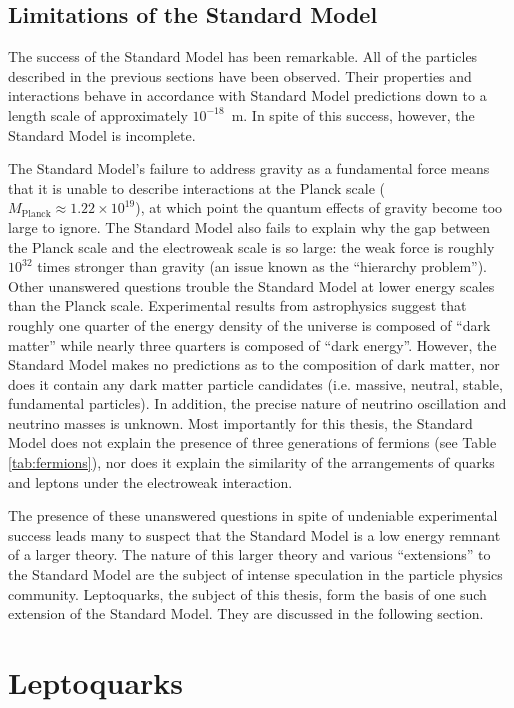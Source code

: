 \subsection{Limitations of the Standard Model}

The success of the Standard Model has been remarkable.
All of the particles described in the previous sections have been 
observed.  Their properties and interactions behave in accordance 
with Standard Model predictions down to a length scale of 
approximately $10^{-18}$~m.  In spite of this success, however, the 
Standard Model is incomplete.  

The Standard Model's failure to address gravity as a fundamental
force means that it is unable to describe interactions at the Planck 
scale ($M_{\text{Planck}} \approx 1.22 \times 10^{19}$), at which
point the quantum effects of gravity become too large to ignore.
The Standard Model also fails to explain why the gap between the Planck
scale and the electroweak scale is so large: the weak force is roughly 
$10^{32}$ times stronger than gravity
(an issue known as the ``hierarchy problem'').
Other unanswered questions trouble the Standard Model at lower energy
scales than the Planck scale.  Experimental results from
astrophysics suggest that roughly one quarter of the energy density of the
universe is composed of ``dark matter'' while nearly three quarters 
is composed of ``dark energy''.  However, the Standard Model makes no predictions
as to the composition of dark matter, nor does it contain any dark
matter particle candidates (i.e. massive, neutral, stable, fundamental particles).
In addition, the precise nature of neutrino oscillation and neutrino masses
is unknown.  Most importantly for this thesis, the Standard Model does not 
explain the presence of three generations of fermions (see Table \ref{tab:fermions}), nor
does it explain the similarity of the arrangements of quarks and leptons under the electroweak interaction.

The presence of these unanswered questions in spite of undeniable 
experimental success leads many to suspect that the Standard Model
is a low energy remnant of a larger theory.  The nature of this larger
theory and various ``extensions'' to the Standard Model are the subject
of intense speculation in the particle physics community.
Leptoquarks, the subject of this thesis, form the basis of 
one such extension of the Standard Model.  They are discussed in the following 
section.

\section{Leptoquarks}

